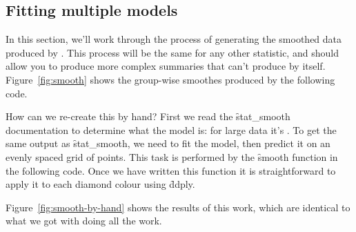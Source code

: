 \subsection{Fitting multiple models}
\label{sub:multiple_models}

In this section, we'll work through the process of generating the smoothed data produced by .  This process will be the same for any other statistic, and should allow you to produce more complex summaries that \ggplot can't produce by itself.  Figure~\ref{fig:smooth} shows the group-wise smoothes produced by the following code.

% 


How can we re-create this by hand?  First we read the \f{stat_smooth} documentation to determine what the model is: for large data it's .  To get the same output as \f{stat_smooth}, we need to fit the model, then predict it on an evenly spaced grid of points. This task is performed by the \f{smooth} function in the following code.  Once we have written this function it is straightforward to apply it to each diamond colour  using \f{ddply}.

Figure~\ref{fig:smooth-by-hand} shows the results of this work, which are identical to what we got with \ggplot doing all the work.

% 
%   


